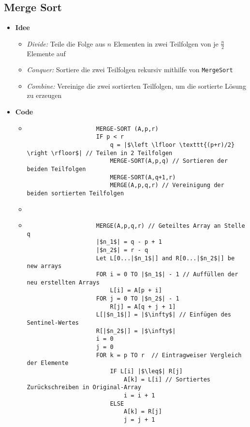 \subsection{Merge Sort} 
    \begin{itemize}
        \item \textbf{Idee} 
            \begin{itemize}
                \item \textit{Divide:} Teile die Folge aus $n$ Elementen in zwei Teilfolgen von je $\frac{n}{2}$ Elemente auf
                \item \textit{Conquer:} Sortiere die zwei Teilfolgen rekursiv mithilfe von \texttt{MergeSort}
                \item \textit{Combine:} Vereinige die zwei sortierten Teilfolgen, um die sortierte Lösung zu erzeugen
            \end{itemize}
        \item \textbf{Code} 
            \begin{itemize}
                \item[]
                    \begin{verbatim}
                    MERGE-SORT (A,p,r)
                    IF p < r
                        q = |$\left \lfloor \texttt{(p+r)/2} \right \rfloor$| // Teilen in 2 Teilfolgen 
                        MERGE-SORT(A,p,q) // Sortieren der beiden Teilfolgen
                        MERGE-SORT(A,q+1,r)
                        MERGE(A,p,q,r) // Vereinigung der beiden sortierten Teilfolgen
                    \end{verbatim}
                \item[]
                \item[]
                    \begin{verbatim}
                    MERGE(A,p,q,r) // Geteiltes Array an Stelle q
                    |$n_1$| = q - p + 1
                    |$n_2$| = r - q 
                    Let L[0...|$n_1$|] and R[0...|$n_2$|] be new arrays 
                    FOR i = 0 TO |$n_1$| - 1 // Auffüllen der neu erstellten Arrays
                        L[i] = A[p + i]
                    FOR j = 0 TO |$n_2$| - 1
                        R[j] = A[q + j + 1]
                    L[|$n_1$|] = |$\infty$| // Einfügen des Sentinel-Wertes
                    R[|$n_2$|] = |$\infty$|
                    i = 0
                    j = 0
                    FOR k = p TO r  // Eintragweiser Vergleich der Elemente          
                        IF L[i] |$\leq$| R[j]
                            A[k] = L[i] // Sortiertes Zurückschreiben in Original-Array
                            i = i + 1
                        ELSE 
                            A[k] = R[j]
                            j = j + 1
                    \end{verbatim}
            \end{itemize}
        

\end{itemize}
